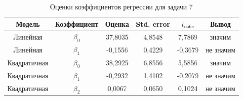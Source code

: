 \begin{table}[H]
\centering
\caption{Оценки коэффициентов регрессии для задачи 7}
\small
\begin{tabular}{cccccc}
\toprule
Модель & Коэффициент & Оценка & Std. error & $t_{\text{набл}}$ & Вывод \\
\midrule
Линейная & $\beta_0$ & 37,8035 & 4,8548 & 7,7869 & значим \\
Линейная & $\beta_1$ & -0,1556 & 0,4229 & -0,3679 & не значим \\
Квадратичная & $\beta_0$ & 38,2925 & 6,8556 & 5,5856 & значим \\
Квадратичная & $\beta_1$ & -0,2932 & 1,4102 & -0,2079 & не значим \\
Квадратичная & $\beta_2$ & 0,0067 & 0,0650 & 0,1024 & не значим \\
\bottomrule
\end{tabular}
\end{table}
